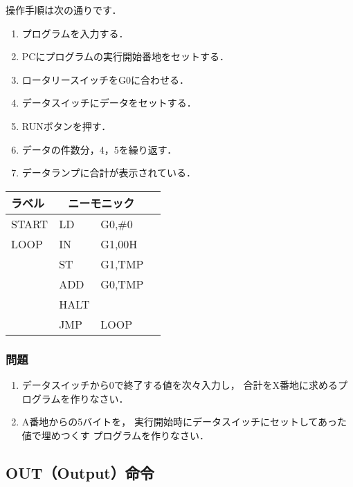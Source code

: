 操作手順は次の通りです．

\begin{enumerate}
\item プログラムを入力する．
\item PCにプログラムの実行開始番地をセットする．
\item ロータリースイッチをG0に合わせる．
\item データスイッチにデータをセットする．
\item RUNボタンを押す．
\item データの件数分，4，5を繰り返す．
\item データランプに合計が表示されている．
\end{enumerate}

{\tt\small\begin{center}
\begin{tabular}{|l|l l|l}
\cline{1-3}
ラベル & \multicolumn{2}{|c|}{ニーモニック} \\
\hline
START & LD   & G0,\#0        \\
LOOP  & IN   & G1,00H        \\
      & ST   & G1,TMP        \\
      & ADD  & G0,TMP        \\
      & HALT &               \\
      & JMP  & LOOP          \\ 
\hline
\end{tabular}
\end{center}}

\vfill
\subsubsection{問題}
\begin{enumerate}
\item データスイッチから0で終了する値を次々入力し，
合計をX番地に求めるプログラムを作りなさい．
\item A番地からの5バイトを，
実行開始時にデータスイッチにセットしてあった値で埋めつくす
プログラムを作りなさい．
\end{enumerate}
\vfill

\subsection{OUT（Output）命令}
\label{out}

